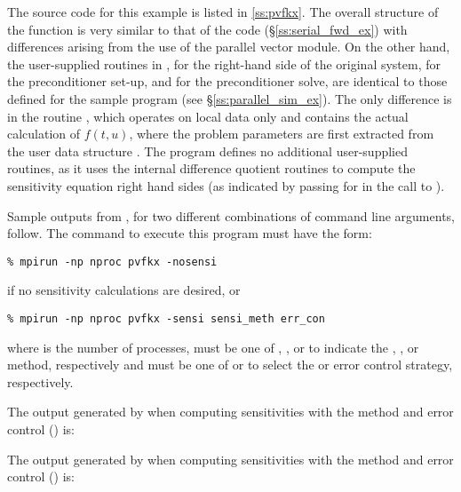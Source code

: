 The source code for this example is listed in \A\ref{ss:pvfkx}.
The overall structure of the  function is very
similar to that of the code  (\S\ref{ss:serial_fwd_ex}) with 
differences arising from the use of the parallel vector module.
On the other hand, the user-supplied routines in ,
 for the right-hand side of the original system,
 for the preconditioner set-up, and  for the
preconditioner solve, are identical to those defined for the sample program
 (see \S\ref{ss:parallel_sim_ex}). The only difference is in the
routine , which operates on local data only and contains the actual 
calculation of $f(t,u)$, where the problem parameters are first extracted from
the user data structure . The program  defines no additional
user-supplied routines, as it uses the {\cvodes} internal difference quotient routines 
to compute the sensitivity equation right hand sides (as indicated by passing
 for  in the call to ).

Sample outputs from , for two different combinations of command line arguments, 
follow. The command to execute this program must have the form:
\begin{verbatim}
% mpirun -np nproc pvfkx -nosensi
\end{verbatim} 
if no sensitivity calculations are desired, or
\begin{verbatim}
% mpirun -np nproc pvfkx -sensi sensi_meth err_con
\end{verbatim}
where  is the number of processes,  must be one of , 
, or  to
indicate the , , or  method,
respectively and  must be one of  or  to
select the  or  error control strategy, respectively.

The output generated by  when computing sensitivities with the 
method and  error control () is:
{\small}

The output generated by  when computing sensitivities with the 
method and  error control () is:
{\small}
